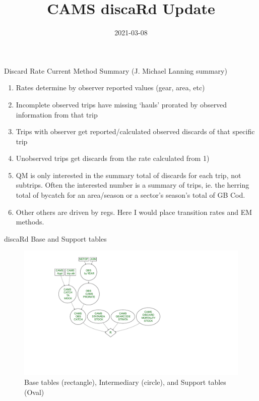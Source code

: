 \documentclass[
  ignorenonframetext,
]{beamer}
\title{CAMS discaRd Update}
\author{Ben Galuardi \& Dan Linden \and \footnote<.->{APSD}}
\date{2021-03-08}
\providecommand{\tightlist}{%
  \setlength{\itemsep}{0pt}\setlength{\parskip}{0pt}}
\begin{document}
\frame{\titlepage}

\begin{frame}{Discard Rate Current Method Summary (J. Michael Lanning
summary)}
\protect\hypertarget{discard-rate-current-method-summary-j.-michael-lanning-summary}{}

\begin{enumerate}
\tightlist
\item
  Rates determine by observer reported values (gear, area, etc)
\item
  Incomplete observed trips have missing `hauls' prorated by observed
  information from that trip
\item
  Trips with observer get reported/calculated observed discards of that
  specific trip
\item
  Unobserved trips get discards from the rate calculated from 1)
\item
  QM is only interested in the summary total of discards for each trip,
  not subtrips. Often the interested number is a summary of trips, ie.
  the herring total of bycatch for an area/season or a sector's season's
  total of GB Cod.
\item
  Other others are driven by regs. Here I would place transition rates
  and EM methods.
\end{enumerate}

\end{frame}

\begin{frame}{discaRd Base and Support tables}
\protect\hypertarget{discard-base-and-support-tables}{}

\begin{figure}
\centering
\includegraphics{discard_documention_beamer_files/figure-beamer/table_flow0-1.pdf}
\caption{Base tables (rectangle), Intermediary (circle), and Support
tables (Oval)}
\end{figure}

\end{frame}
\end{document}

